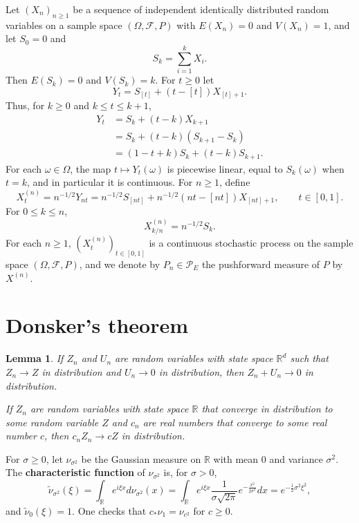 \documentclass{article}
\newtheorem{lemma}[theorem]{Lemma}
\theoremstyle{definition}
\begin{document}
Let $(X_n)_{n \geq 1}$ be a sequence of independent identically distributed random variables on a sample space
$(\Omega,\mathscr{F},P)$ with $E(X_n)=0$ and $V(X_n)=1$, and let $S_0=0$ and
\[
S_k = \sum_{i=1}^k X_i.
\]
Then $E(S_k)=0$ and $V(S_k) = k$. 
For $t \geq 0$ let 
\[
Y_t = S_{[t]} + (t-[t]) X_{[t]+1}.
\]
Thus, for $k \geq 0$ and $k \leq t \leq k+1$,
\begin{align*}
Y_t &= S_k + (t-k) X_{k+1}\\
& = S_k + (t-k) (S_{k+1}-S_k)\\
& = (1-t+k)S_k +(t-k)S_{k+1}.
\end{align*}
For each $\omega \in \Omega$, the map $t \mapsto Y_t(\omega)$ is piecewise linear, equal to $S_k(\omega)$ when $t=k$, and in particular
it is continuous. 
For $n \geq 1$, define
\begin{equation}
X_t^{(n)} = n^{-1/2} Y_{nt} = n^{-1/2} S_{[nt]} + n^{-1/2}(nt-[nt])X_{[nt]+1}, \qquad t \in [0,1].
\label{Xtn}
\end{equation}
For $0 \leq k \leq n$,
\[
X_{k/n}^{(n)} = n^{-1/2} S_k.
\]
For each $n \geq 1$, $(X^{(n)}_t)_{t \in [0,1]}$ is a continuous stochastic process on the sample space $(\Omega,\mathscr{F},P)$, and we denote
by $P_n \in \mathscr{P}_E$ the pushforward measure of $P$ by $X^{(n)}$. 




\section{Donsker's theorem}
\begin{lemma}
If $Z_n$ and $U_n$ are random variables with state space $\mathbb{R}^d$ such that
$Z_n \to Z$ in distribution and $U_n \to 0$ in distribution, then $Z_n + U_n \to 0$ in distribution.

If $Z_n$ are random variables  with state space $\mathbb{R}$ that converge
in distribution to some random variable $Z$ and $c_n$ are real numbers that converge to some real number $c$, then
$c_n Z_n \to cZ$ in distribution. 
\label{191}
\end{lemma}

For $\sigma \geq 0$, let $\nu_{\sigma^2}$ be the Gaussian measure on $\mathbb{R}$ with mean $0$ and
variance $\sigma^2$.
The \textbf{characteristic function} of $\nu_{\sigma^2}$ is, for $\sigma > 0$,
\[
\widetilde{\nu}_{\sigma^2}(\xi) = \int_{\mathbb{R}} e^{i\xi x} d\nu_{\sigma^2}(x) = 
\int_{\mathbb{R}} e^{i\xi x} \frac{1}{\sigma \sqrt{2\pi}} e^{-\frac{x^2}{2\sigma^2}} dx
=e^{-\frac{1}{2}\sigma^2 \xi^2},
\]
and $\widetilde{\nu}_0(\xi) = 1$. One checks that $c_* \nu_1 = \nu_{c^2}$ for $c \geq 0$. 
\end{document}
